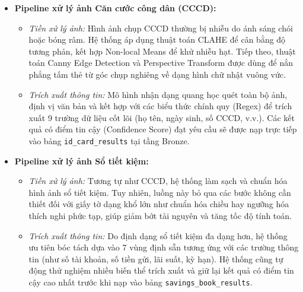 \begin{itemize}
    \item \textbf{Pipeline xử lý ảnh Căn cước công dân (CCCD):}
    \begin{itemize}
        \item \textit{Tiền xử lý ảnh:} Hình ảnh chụp CCCD thường bị nhiễu do ánh sáng chói hoặc bóng râm. Hệ thống áp dụng thuật toán CLAHE để cân bằng độ tương phản, kết hợp Non-local Means để khử nhiễu hạt. Tiếp theo, thuật toán Canny Edge Detection và Perspective Transform được dùng để nắn phẳng tấm thẻ từ góc chụp nghiêng về dạng hình chữ nhật vuông vức.
        \item \textit{Trích xuất thông tin:} Mô hình nhận dạng quang học quét toàn bộ ảnh, định vị văn bản và kết hợp với các biểu thức chính quy (Regex) để trích xuất 9 trường dữ liệu cốt lõi (họ tên, ngày sinh, số CCCD, v.v.). Các kết quả có điểm tin cậy (Confidence Score) đạt yêu cầu sẽ được nạp trực tiếp vào bảng \texttt{id\_card\_results} tại tầng Bronze.
    \end{itemize}

    \item \textbf{Pipeline xử lý ảnh Sổ tiết kiệm:}
    \begin{itemize}
        \item \textit{Tiền xử lý ảnh:} Tương tự như CCCD, hệ thống làm sạch và chuẩn hóa hình ảnh sổ tiết kiệm. Tuy nhiên, luồng này bỏ qua các bước không cần thiết đối với giấy tờ dạng khổ lớn như chuẩn hóa chiều hay ngưỡng hóa thích nghi phức tạp, giúp giảm bớt tài nguyên và tăng tốc độ tính toán.
        \item \textit{Trích xuất thông tin:} Do định dạng sổ tiết kiệm đa dạng hơn, hệ thống ưu tiên bóc tách dựa vào 7 vùng định sẵn tương ứng với các trường thông tin (như số tài khoản, số tiền gửi, lãi suất, kỳ hạn). Hệ thống cũng tự động thử nghiệm nhiều biến thể trích xuất và giữ lại kết quả có điểm tin cậy cao nhất trước khi nạp vào bảng \texttt{savings\_book\_results}.
    \end{itemize}
\end{itemize}
